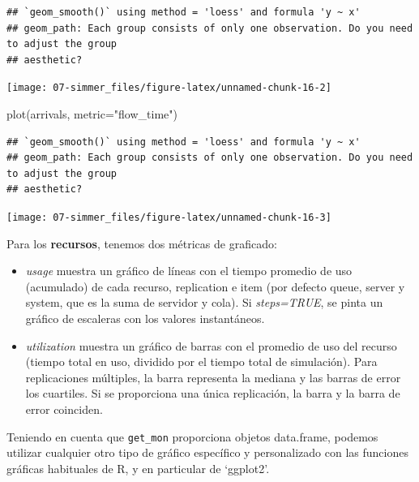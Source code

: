 \documentclass[
]{book}
\newenvironment{Shaded}{\begin{snugshade}}{\end{snugshade}}
\newcommand{\AttributeTok}[1]{\textcolor[rgb]{0.77,0.63,0.00}{#1}}
\newcommand{\FunctionTok}[1]{\textcolor[rgb]{0.00,0.00,0.00}{#1}}
\newcommand{\NormalTok}[1]{#1}
\newcommand{\StringTok}[1]{\textcolor[rgb]{0.31,0.60,0.02}{#1}}
\providecommand{\tightlist}{%
  \setlength{\itemsep}{0pt}\setlength{\parskip}{0pt}}
\theoremstyle{definition}
\theoremstyle{definition}
\theoremstyle{definition}
\theoremstyle{definition}
\theoremstyle{remark}
\begin{document}
\begin{verbatim}
## `geom_smooth()` using method = 'loess' and formula 'y ~ x'
## geom_path: Each group consists of only one observation. Do you need to adjust the group
## aesthetic?
\end{verbatim}

\begin{center}\texttt{[image: 07-simmer\_files/figure-latex/unnamed-chunk-16-2]} \end{center}

\begin{Shaded}
\begin{Highlighting}[]
\FunctionTok{plot}\NormalTok{(arrivals, }\AttributeTok{metric=}\StringTok{"flow\_time"}\NormalTok{)}
\end{Highlighting}
\end{Shaded}

\begin{verbatim}
## `geom_smooth()` using method = 'loess' and formula 'y ~ x'
## geom_path: Each group consists of only one observation. Do you need to adjust the group
## aesthetic?
\end{verbatim}

\begin{center}\texttt{[image: 07-simmer\_files/figure-latex/unnamed-chunk-16-3]} \end{center}

Para los \textbf{recursos}, tenemos dos métricas de graficado:

\begin{itemize}
\tightlist
\item
  \emph{usage} muestra un gráfico de líneas con el tiempo promedio de uso (acumulado) de cada recurso, replication e item (por defecto queue, server y system, que es la suma de servidor y cola). Si \emph{steps=TRUE}, se pinta un gráfico de escaleras con los valores instantáneos.
\item
  \emph{utilization} muestra un gráfico de barras con el promedio de uso del recurso (tiempo total en uso, dividido por el tiempo total de simulación). Para replicaciones múltiples, la barra representa la mediana y las barras de error los cuartiles. Si se proporciona una única replicación, la barra y la barra de error coinciden.
\end{itemize}

Teniendo en cuenta que \texttt{get\_mon} proporciona objetos data.frame, podemos utilizar cualquier otro tipo de gráfico específico y personalizado con las funciones gráficas habituales de R, y en particular de `ggplot2'.
\end{document}
